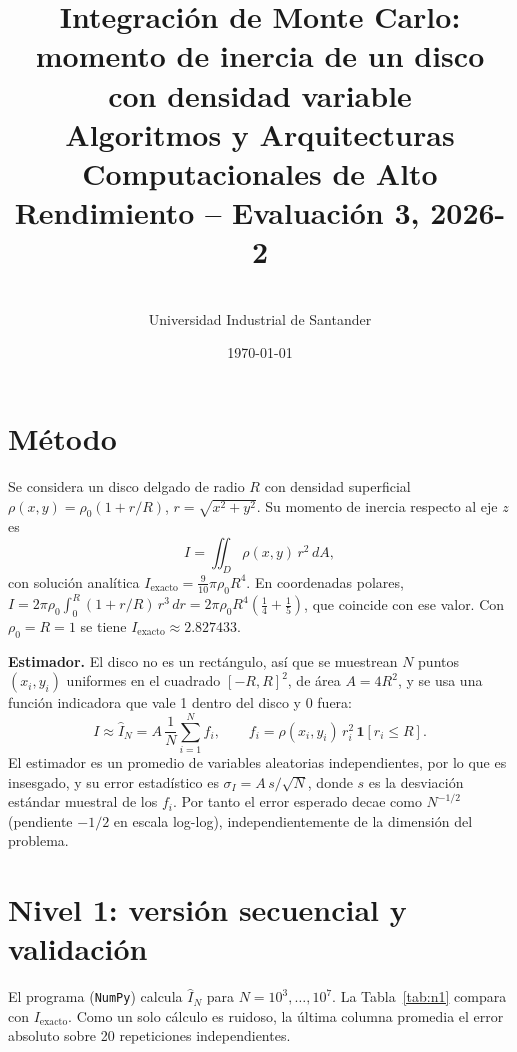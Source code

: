 \documentclass[11pt,a4paper]{article}
\title{Integración de Monte Carlo: momento de inercia de un disco con densidad variable\\[2pt]
\large Algoritmos y Arquitecturas Computacionales de Alto Rendimiento -- Evaluación 3, 2026-2}
\author{\pend{Nombre y código} \\ Universidad Industrial de Santander}
\date{\today}
\begin{document}
\maketitle

\section{Método}
Se considera un disco delgado de radio $R$ con densidad superficial $\rho(x,y)=\rho_0(1+r/R)$, $r=\sqrt{x^2+y^2}$. Su momento de inercia respecto al eje $z$ es
\begin{equation}
I=\iint_D \rho(x,y)\, r^2\, dA ,
\end{equation}
con solución analítica $I_{\text{exacto}}=\tfrac{9}{10}\pi\rho_0R^4$. En coordenadas polares, $I=2\pi\rho_0\int_0^R(1+r/R)\,r^3\,dr=2\pi\rho_0R^4\left(\tfrac14+\tfrac15\right)$, que coincide con ese valor. Con $\rho_0=R=1$ se tiene $I_{\text{exacto}}\approx 2.827433$.

\textbf{Estimador.} El disco no es un rectángulo, así que se muestrean $N$ puntos $(x_i,y_i)$ uniformes en el cuadrado $[-R,R]^2$, de área $A=4R^2$, y se usa una función indicadora que vale 1 dentro del disco y 0 fuera:
\begin{equation}
I\approx \hat I_N = A\,\frac1N\sum_{i=1}^{N}f_i,\qquad f_i=\rho(x_i,y_i)\,r_i^2\,\mathbf 1[r_i\le R].
\end{equation}
El estimador es un promedio de variables aleatorias independientes, por lo que es insesgado, y su error estadístico es $\sigma_I = A\,s/\sqrt N$, donde $s$ es la desviación estándar muestral de los $f_i$. Por tanto el error esperado decae como $N^{-1/2}$ (pendiente $-1/2$ en escala log-log), independientemente de la dimensión del problema.

\section{Nivel 1: versión secuencial y validación}
El programa (\texttt{NumPy}) calcula $\hat I_N$ para $N=10^3,\dots,10^7$. La Tabla~\ref{tab:n1} compara con $I_{\text{exacto}}$. Como un solo cálculo es ruidoso, la última columna promedia el error absoluto sobre 20 repeticiones independientes.
\end{document}
